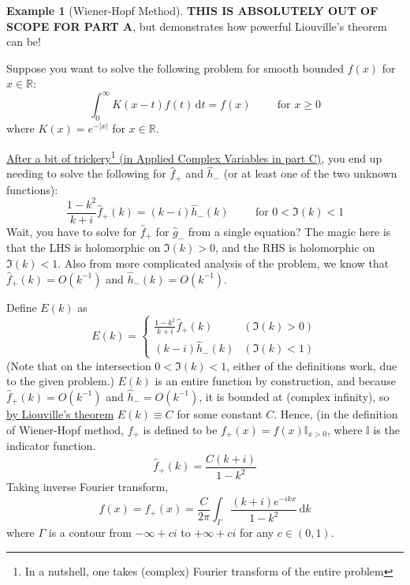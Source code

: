 \documentclass[a4paper, 12pt]{article}
\theoremstyle{definition}
\newtheorem{example}{Example}
\numberwithin{theorem}{section}
\numberwithin{definition}{section}
\numberwithin{exercise}{section}
\numberwithin{remark}{section}
\numberwithin{figure}{section}
\numberwithin{example}{section}
\newcommand{\R}{\mathbb{R}}
\newcommand{\intd}{\,\text{d}}
\begin{document}
\begin{example}[Wiener-Hopf Method]
    \textbf{THIS IS ABSOLUTELY OUT OF SCOPE FOR PART A},
    but demonstrates how powerful Liouville's theorem can be!

    Suppose you want to solve the following problem for smooth bounded $f(x)$ for $x \in \R$:
    \begin{equation*}
        \int_{0}^{\infty} K (x-t) f(t) \intd t = f(x) \hspace{1cm} \text{for } x\geq 0
    \end{equation*}
    where $K(x) = e^{-|x|}$ for $x \in \R$.

    \ul{After a bit of trickery\footnote{In a nutshell, one takes (complex) Fourier transform of the entire problem} (in Applied Complex Variables in part C)},
    you end up needing to solve the following for
    $\hat f_{+}$ and $\hat h_{-}$ (or at least one of the two unknown functions):
    \begin{equation*}
        \frac{1-k^2}{k+i} \hat f_{+} (k) = \left( k-i \right) \hat h_{-}(k) \hspace{1cm} \text{for } 0 < \Im (k) < 1
    \end{equation*}
    Wait, you have to solve for $\hat f_{+}$ for $\hat g_{-}$ from a single equation?
    The magic here is that the LHS is holomorphic on $\Im (k) > 0$,
    and the RHS is holomorphic on $\Im (k) < 1$.
    Also from more complicated analysis of the problem, we know that
    $\hat f_{+}(k) = O\left( k^{-1} \right)$ and $\hat h_{-} (k) = O\left( k^{-1} \right)$.

    Define $E(k)$ as
    \begin{equation*}
        E(k) = 
        \begin{cases}
            \frac{1-k^2}{k+i} \hat f_{+} (k) & (\Im (k) > 0) \\
            (k-i) \hat h_{-}(k) & (\Im (k) < 1)
        \end{cases}
    \end{equation*}
    (Note that on the intersection $0 < \Im (k) < 1$, either of the definitions work,
    due to the given problem.)
    $E(k)$ is an entire function by construction, and because $\hat f_{+} (k) = O\left( k^{-1} \right)$ and $\hat h_{-} = O\left( k^{-1} \right)$,
    it is bounded at (complex infinity),
    so \ul{by Liouville's theorem} $E(k) \equiv C$ for some constant $C$.
    Hence, (in the definition of Wiener-Hopf method, $f_{+}$ is defined to be $f_{+}(x) = f(x) \mathbb{I}_{x>0}$, where $\mathbb{I}$ is the indicator function.
    \begin{equation*}
        \hat f_{+}(k) = \frac{C\left( k+i \right)}{1-k^2}
    \end{equation*}
    Taking inverse Fourier transform,
    \begin{equation*}
        f(x) = f_{+} (x) = \frac{C}{2\pi} \int_{\Gamma} \frac{\left( k+i \right)e^{-ikx}}{1-k^2} \intd k
    \end{equation*}
    where $\Gamma$ is a contour from $-\infty + ci$ to $+\infty + ci$ for any $c \in \left( 0,1 \right)$.

\end{example}
\end{document}
